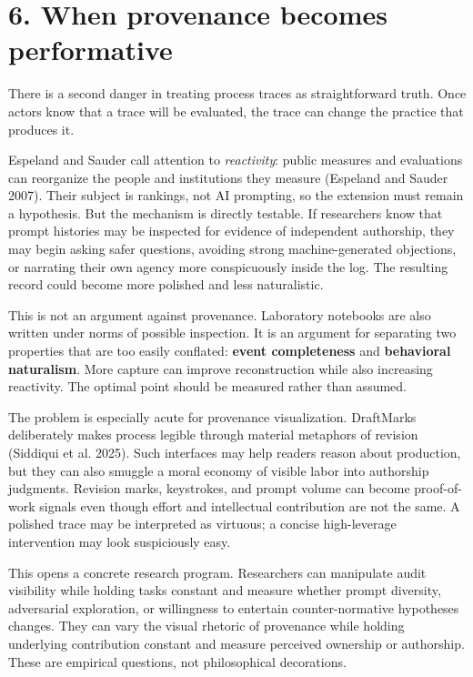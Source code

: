 \documentclass[
]{article}
\begin{document}
\section{6. When provenance becomes
performative}\label{when-provenance-becomes-performative}

There is a second danger in treating process traces as straightforward
truth. Once actors know that a trace will be evaluated, the trace can
change the practice that produces it.

Espeland and Sauder call attention to \emph{reactivity}: public measures
and evaluations can reorganize the people and institutions they measure
(Espeland and Sauder 2007). Their subject is rankings, not AI prompting,
so the extension must remain a hypothesis. But the mechanism is directly
testable. If researchers know that prompt histories may be inspected for
evidence of independent authorship, they may begin asking safer
questions, avoiding strong machine-generated objections, or narrating
their own agency more conspicuously inside the log. The resulting record
could become more polished and less naturalistic.

This is not an argument against provenance. Laboratory notebooks are
also written under norms of possible inspection. It is an argument for
separating two properties that are too easily conflated: \textbf{event
completeness} and \textbf{behavioral naturalism}. More capture can
improve reconstruction while also increasing reactivity. The optimal
point should be measured rather than assumed.

The problem is especially acute for provenance visualization. DraftMarks
deliberately makes process legible through material metaphors of
revision (Siddiqui et al. 2025). Such interfaces may help readers reason
about production, but they can also smuggle a moral economy of visible
labor into authorship judgments. Revision marks, keystrokes, and prompt
volume can become proof-of-work signals even though effort and
intellectual contribution are not the same. A polished trace may be
interpreted as virtuous; a concise high-leverage intervention may look
suspiciously easy.

This opens a concrete research program. Researchers can manipulate audit
visibility while holding tasks constant and measure whether prompt
diversity, adversarial exploration, or willingness to entertain
counter-normative hypotheses changes. They can vary the visual rhetoric
of provenance while holding underlying contribution constant and measure
perceived ownership or authorship. These are empirical questions, not
philosophical decorations.
\end{document}
